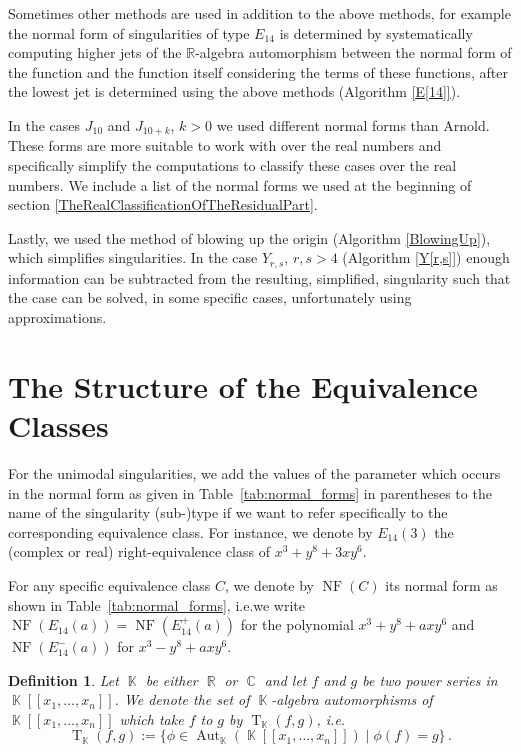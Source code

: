 \documentclass[noend]{amsproc}
\newtheorem{defn}[theorem]{Definition}
\theoremstyle{definition}
\newcommand{\NF}[1]{\operatorname{NF}(#1)}
\DeclareMathOperator{\R}{\mathbb{R}}
\DeclareMathOperator{\C}{\mathbb{C}}
\DeclareMathOperator{\K}{\mathbb{K}}
\DeclareMathOperator{\T}{T}
\DeclareMathOperator{\Aut}{Aut}
\begin{document}
Sometimes other methods are used in addition to the above methods, for example
the normal form of singularities of type $E_{14}$ is determined by
systematically computing higher jets of the $\mathbb R$-algebra automorphism
between the normal form of the function and the function itself considering the
terms of these functions, after the lowest jet is determined using the above
methods (Algorithm \ref{E[14]}).

In the cases $J_{10}$ and $J_{10+k}$, $k>0$ we used different normal forms than
Arnold. These forms are more suitable to work with over the real numbers and
specifically simplify the computations to classify these cases over the real
numbers. We include a list of the normal forms we used at the beginning of
section \ref{TheRealClassificationOfTheResidualPart}.

Lastly, we used the method of blowing up the origin (Algorithm
\ref{BlowingUp}), which simplifies singularities. In the case $Y_{r,s}$,
$r,s>4$ (Algorithm \ref{Y[r,s]}) enough information can be subtracted from the
resulting, simplified, singularity such that the case can be solved, in some
specific cases, unfortunately using approximations.

\newpage

\section{The Structure of the Equivalence Classes}

For the unimodal singularities, we add the values of the parameter which occurs
in the normal form as given in Table~\ref{tab:normal_forms} in parentheses to
the name of the singularity (sub-)type if we want to refer specifically to the
corresponding equivalence class. For instance, we denote by $E_{14}(3)$ the
(complex or real) right-equivalence class of $x^3+y^8+3xy^6$.

For any specific equivalence class $C$, we denote by $\NF{C}$ its normal form
as shown in Table~\ref{tab:normal_forms}, i.e.\@ we write
$\NF{E_{14}(a)} = \NF{E_{14}^+(a)}$ for the polynomial $x^3+y^8+axy^6$ and
$\NF{E_{14}^-(a)}$ for $x^3-y^8+axy^6$.

\begin{defn}
Let $\K$ be either $\R$ or $\C$ and let $f$ and $g$ be two power series in
$\K[[x_1, \ldots, x_n]]$. We denote the set of $\K$-algebra automorphisms
of $\K[[x_1, \ldots, x_n]]$ which take $f$ to $g$ by $\T_{\K}(f,g)$, i.e.\@
\[
\T_{\K}(f,g)
:= \{\phi \in \Aut_{\K}(\K[[x_1, \ldots, x_n]]) \mid \phi(f) = g \} \,.
\]
\end{defn}
\end{document}
